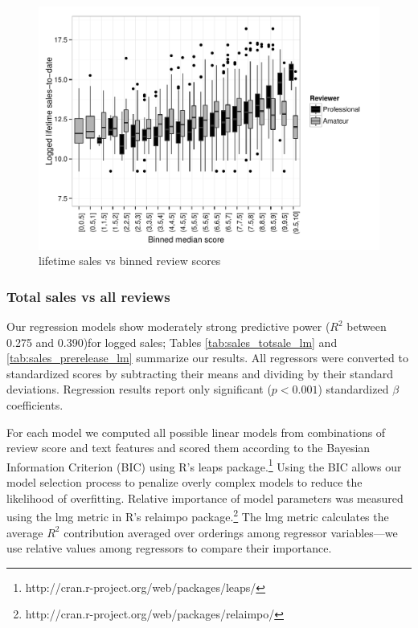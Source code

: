 \documentclass[letterpaper]{article}
\begin{document}
\begin{figure}[tbph]
\centering
\includegraphics[width=\linewidth]{./sales_binnedscore_vs_total}
\caption{lifetime sales vs binned review scores}
\label{fig:lifesale_revscore_boxplot}
\end{figure}

\subsubsection{Total sales vs all reviews}
Our regression models show moderately strong predictive power ($R^2$ between 0.275 and 0.390)for logged sales; Tables \ref{tab:sales_totsale_lm} and \ref{tab:sales_prerelease_lm} summarize our results. All regressors were converted to standardized scores by subtracting their means and dividing by their standard deviations. Regression results report only significant ($p < 0.001$) standardized $\beta$ coefficients.

For each model we computed all possible linear models from combinations of review score and text features and scored them according to the Bayesian Information Criterion (BIC) using R's leaps package.\footnote{http://cran.r-project.org/web/packages/leaps/} Using the BIC allows our model selection process to penalize overly complex models to reduce the likelihood of overfitting. Relative importance of model parameters was measured using the lmg metric in R's relaimpo package.\footnote{http://cran.r-project.org/web/packages/relaimpo/} The lmg metric calculates the average $R^2$ contribution averaged over orderings among regressor variables---we use relative values among regressors to compare their importance.
\end{document}
